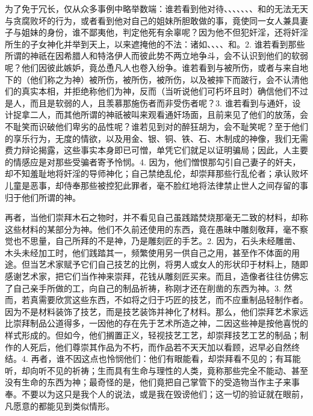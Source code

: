 为了免于冗长，仅从众多事例中略举数端：谁若看到他对待、、、、、、、和的无法无天与贪腐败坏的行为，或者看到他对自己的姐妹所胆敢做的事，竟使同一女人兼具妻子与姐妹的身份，谁不鄙夷他，判定他死有余辜呢？因为他不但犯奸淫，还将奸淫所生的子女神化并举到天上，以来遮掩他的不法：诸如、、、、和。2. 谁若看到那些所谓的神祇在因希腊人和特洛伊人而彼此势不两立地争斗，会不认识到他们的软弱呢？他们因彼此嫉妒，竟怂恿凡人也卷入纷争。谁若看到与被所伤，或者与来自地下的（他们称之为神）被所伤，被所伤，被所伤，以及被摔下而跛行，会不认清他们的真实本相，并拒绝称他们为神，反而（当听说他们可朽坏且时）确信他们不过是人，而且是软弱的人，且羡慕那施伤者而非受伤者呢？3. 谁若看到与通奸，设计捉拿二人，而其他所谓的神祇被叫来观看通奸场面，且前来见了他们的放荡，会不耻笑而识破他们卑劣的品性呢？谁若见到对的醉狂胡为，会不耻笑呢？至于他们的享乐行为，无度的情欲，以及用金、银、铜、铁、石、木制成的神像，我们无需费力辩论揭露，这些事实本身即已可憎，单凭它们就足以证明骗局；因此，人主要的情感应是对那些受骗者寄予怜悯。4. 因为，他们憎恨那勾引自己妻子的奸夫，却不知羞耻地将奸淫的导师神化；自己禁绝乱伦，却崇拜那些行乱伦者；承认败坏儿童是恶事，却侍奉那些被控犯此罪者，毫不脸红地将法律禁止世人之间存留的事归于他们所谓的神。\par

\par

再者，当他们崇拜木石之物时，并不看见自己虽践踏焚烧那毫无二致的材料，却称这些材料的某部分为神。他们不久前还使用的东西，竟在愚昧中雕刻敬拜，毫不察觉也不思量，自己所拜的不是神，乃是雕刻匠的手艺。2. 因为，石头未经雕凿、木头未经加工时，他们践踏其一，频繁使用另一供自己之用，甚至作不体面的用途。但当艺术家赋予它们自己技艺的比例，将男人或女人的形状印于材料上，随即感谢艺术家，把它们当作神来崇拜，花钱从雕刻匠买来。而且，造像者往往仿佛忘了自己亲手所做的工，向自己的制品祈祷，称刚才还在削凿的东西为神。3. 然而，若真需要欣赏这些东西，不如将之归于巧匠的技艺，而不应重制品轻制作者。因为不是材料装饰了技艺，而是技艺装饰并神化了材料。那么，他们崇拜艺术家远比崇拜制品公道得多，一因他的存在先于艺术所造之神，二因这些神是按他喜悦的样式形成的。但如今，他们搁置正义，轻视技艺工艺，却崇拜技艺工艺的制品；制作的人死后，他们尊崇其作品为不朽，而作品若不天天加以看顾，迟早必自然终结。4. 再者，谁不因这点也怜悯他们：他们有眼能看，却崇拜看不见的；有耳能听，却向听不见的祈祷；生而具有生命与理性的人类，竟称那些完全不能动、甚至没有生命的东西为神；最奇怪的是，他们竟把自己掌管下的受造物当作主子来事奉。不要以为这只是我个人的说法，或是我在毁谤他们；这一切的验证就在眼前，凡愿意的都能见到类似情形。\par


